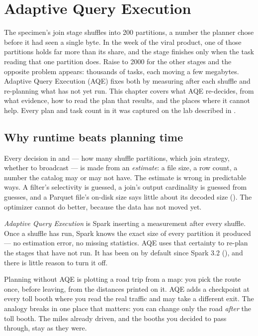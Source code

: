 \chapter{Adaptive Query Execution}
\label{ch:aqe}

\begin{chapterintro}
The specimen's join stage shuffles into 200 partitions, a number the planner
chose before it had seen a single byte. In the week of the viral product, one
of those partitions holds far more than its share, and the stage finishes only
when the task reading that one partition does. Raise
 to 2000 for the other stages and the
opposite problem appears: thousands of tasks, each moving a few megabytes.
Adaptive Query Execution (AQE) fixes both by measuring after each shuffle and
re-planning what has not yet run. This chapter covers what AQE re-decides, from
what evidence, how to read the plan that results, and the places where it
cannot help. Every plan and task count in it was captured on the lab described
in .
\end{chapterintro}

\section{Why runtime beats planning time}
\label{sec:aqe-why}

Every decision in  and  --- how many shuffle
partitions, which join strategy, whether to broadcast --- is made from an
\emph{estimate}: a file size, a row count, a number the catalog may or may not
have. The estimate is wrong in predictable ways. A filter's selectivity is
guessed, a join's output cardinality is guessed from guesses, and a Parquet
file's on-disk size says little about its decoded size
(). The optimizer cannot do better, because the data has
not moved yet.

\emph{Adaptive Query Execution} is Spark inserting a measurement after every
shuffle. Once a shuffle has run, Spark knows the exact size of every partition
it produced --- no estimation error, no missing statistics. AQE uses that
certainty to re-plan the stages that have not run. It has been on by default
since Spark 3.2 (), and there is little reason
to turn it off.

\begin{analogy}
Planning without AQE is plotting a road trip from a map: you pick the route
once, before leaving, from the distances printed on it. AQE adds a checkpoint
at every toll booth where you read the real traffic and may take a different
exit. The analogy breaks in one place that matters: you can change only the road
\emph{after} the toll booth. The miles already driven, and the booths you
decided to pass through, stay as they were.
\end{analogy}

